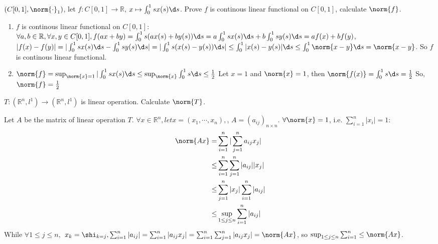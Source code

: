 \documentclass{ctexart}
\newif\ifpreface
\begin{document}
\large
\setlength{\baselineskip}{1.2em}
\ifpreface
    
\else
\maketitle
\fi
{}
\begin{problem}
    $(C[0,1],\norm{\cdot}_1)$, let $f:C[0,1]\to \mathbb{R}$, $x\mapsto\int_0^1sx(s)\d s$. 
    Prove $f$ is continous linear functional on $C[0,1]$, calculate $\norm{f}$.
\end{problem}
\begin{solution}
  \begin{enumerate}
    \item \(f\) is continous linear functional on \(C[0,1]\):
      \(\forall a,b \in \mathbb{R}, \forall x,y \in C[0,1], f(ax+by)=\int_{0}^{1} s(ax(s)+by(s)) \d s=a\int_{0}^{1} sx(s)\d s+b\int_{0}^{1}  sy(s)\d s=af(x)+bf(y)\), 
      \(|f(x)-f(y)| = |\int_{0}^{1} sx(s) \d s- \int_{0}^{1} sy(s)\d s|= |\int_{0}^{1} s(x(s)-y(s)) \d s|\leq \int_{0}^{1} |x(s)-y(s)|\d s \leq \int_{0}^{1} \norm{x-y} \d s=\norm{x-y}\). 
      So \(f\) is continous linear functional.
    \item \(\norm{f}=\sup_{\norm{x}=1} |\int_{0}^{1} sx(s)\d s \leq \sup_{\norm{x}} \int_{0}^{1} s \d s \leq \frac{1}{2}\)
      Let \(x=1\) and \(\norm{x}=1\), then \(\norm{f(x)}=\int_{0}^{1} s \d s = \frac{1}{2}\)
      So, \(\norm{f}=\frac{1}{2}\)
  \end{enumerate}
\end{solution}

\begin{problem}
    $T:(\mathbb{R}^n,l^1)\to (\mathbb{R}^n,l^1)$ is linear operation. Calculate $\norm{T}$.
\end{problem}
\begin{solution}
  Let \(A\) be the matrix of linear operation \(T\). \(\forall x \in \mathbb{R}^{n} , let x = (x_1,\cdots,x_n), \), \(A=(a_{ij})_{n \times n}\). 
  \(\forall \norm{x}=1\), i.e. \(\sum_{i=1}^{n} |x_i|=1\):
  \begin{equation}
    \begin{aligned}
      \, \norm{Ax}=&\sum_{i=1}^{n} |\sum_{j=1}^{n} a_{ij}x_j|\\
    \,\,\,\  \leq&\sum_{i=1}^{n} \sum_{j=1}^{n} |a_{ij}||x_j|\\
    \, \leq&\sum_{j=1}^{n} |x_j|\sum_{i=1}^{n} |a_{ij}|\\
    \leq&\sup_{1 \leq j \leq n} \sum_{i=1}^{n} |a_{ij}|\\
    \end{aligned}
  \end{equation}
While \(\forall 1 \leq j \leq n,\) \(x_k=\shi_{k=j}, \sum_{i=1}^{n} |a_{ij}|=\sum_{i=1}^{n} |a_{ij}x_j|
=\sum_{i=1}^{n} \sum_{j=1}^{n} |a_{ij}x_j|=\norm{Ax}\), 
so \(\sup_{1 \leq j \leq n} \sum_{i=1}^{n} \leq \norm{Ax}\).
  
\end{solution}
\end{document}
